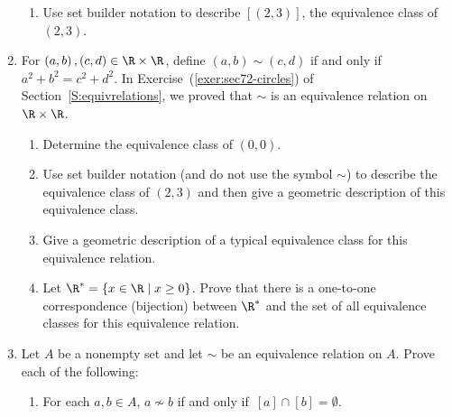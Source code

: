 \begin{enumerate}
\begin{enumerate}
  \item Use set builder notation to describe  $\left[ {\left( {2, 3} \right)} \right]$, the                 equivalence class of  $\left( {2, 3} \right)$.
\end{enumerate}


\item For $\left(a, b \right), \left( c, d \right) \in \R \times \R$, define 
$\left(a, b \right) \sim \left(c, d \right)$ if and only if $a^2 + b^2 = c^2 + d^2$.  In 
Exercise~(\ref{exer:sec72-circles}) of Section~\ref{S:equivrelations}, we proved that $\sim$ is an equivalence relation on $\R \times \R$.

\begin{enumerate}
\item Determine the equivalence class of $\left(0, 0 \right)$.

\item Use set builder notation (and do not use the symbol $\sim$) to describe the equivalence class of $\left(2, 3 \right)$ and then give a geometric description of this equivalence class.

\item Give a geometric description of a typical equivalence class for this equivalence relation.

\item Let $\R^* = \left\{ x \in \R \mid x \geq 0 \right\}$.  Prove that there is a one-to-one correspondence (bijection) between $\R^*$ and the set of all equivalence classes for this equivalence relation.
\end{enumerate}



\item Let  $A$  be a nonempty set and let  $\sim$  be an equivalence relation on  $A$.  Prove each of the following:

\begin{enumerate}
  \item For each  $a, b \in A$,    $a\nsim b$ if and only if\,   
        $\left[ a \right] \cap \left[ b \right] = \emptyset $.


\end{enumerate}
\end{enumerate}
